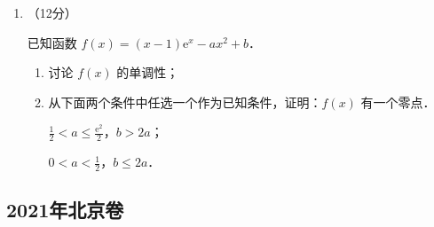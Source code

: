 \begin{description}
\begin{enumerate}[leftmargin=5pt]
        一种微生物群体可以经过自身繁殖不断生存下来，设一个这种微生物为第0代，经过一次繁殖后为第1代，再经过一次繁殖后为第2代……该微生物每代繁殖的个数是相互独立的且有相同的分布列，设 $X$ 表示1个微生物个体繁殖下一代的个数，$P(X=i)=p_{i}>0$（$i=0,1,2,3$）．

        \begin{enumerate}[label=(\arabic*)]
            \item 已知 $p_{0}=0.4$，$p_{1}=0.3$，$p_{2}=0.2$，$p_{3}=0.1$，求 $E(X)$；
            \item 设 $p$ 表示该种微生物经过多代繁殖后临近灭绝的概率，$p$ 是关于 $x$ 的方程 $p_{0}+p_{1}x+p_{2}x^{2}+p_{3}x^{3}=x$ 的一个最小正实根，求证：当 $E(X)\leqslant1$ 时 $p=1$，当 $E(X)>1$ 时 $p<1$；
            \item 根据你的理解说明（2）问结论的实际含义．
        \end{enumerate}

        \item （12分）

        已知函数 $f(x)=(x-1)\mathrm{e}^{x}-ax^{2}+b$．

        \begin{enumerate}[label=(\arabic*)]
            \item 讨论 $f(x)$ 的单调性；
            \item 从下面两个条件中任选一个作为已知条件，证明：$f(x)$ 有一个零点．

             $\frac{1}{2}<a\leqslant\frac{\mathrm{e}^{2}}{2}$，$b>2a$；

             $0<a<\frac{1}{2}$，$b\leqslant2a$．
        \end{enumerate}
    \end{enumerate}
\end{description}
\clearpage



\subsection{2021年北京卷}\label{gk:2021年北京卷}

